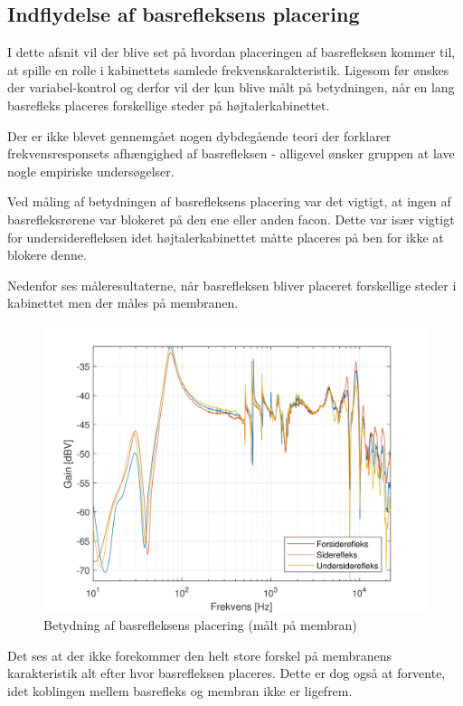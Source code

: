 \subsection{Indflydelse af basrefleksens placering}
I dette afsnit vil der blive set på hvordan placeringen af basrefleksen kommer til, at spille en rolle i kabinettets samlede frekvenskarakteristik. Ligesom før ønskes der variabel-kontrol og derfor vil der kun blive målt på betydningen, når en lang basrefleks placeres forskellige steder på højtalerkabinettet.

Der er ikke blevet gennemgået nogen dybdegående teori der forklarer frekvensresponsets afhængighed af basrefleksen - alligevel ønsker gruppen at lave nogle empiriske undersøgelser.

Ved måling af betydningen af basrefleksens placering var det vigtigt, at ingen af basrefleksrørene var blokeret på den ene eller anden facon. Dette var især vigtigt for undersiderefleksen idet højtalerkabinettet måtte placeres på ben for ikke at blokere denne.

Nedenfor ses måleresultaterne, når basrefleksen bliver placeret forskellige steder i kabinettet men der måles på membranen.
\begin{figure}[H]
	\centering
	\vspace{-12pt}
	\includegraphics[width=\textwidth]{Billeder/Grafer/BasrefleksPlacementClose}
	\caption{Betydning af basrefleksens placering (målt på membran)}
\end{figure}

Det ses at der ikke forekommer den helt store forskel på membranens karakteristik alt efter hvor basrefleksen placeres. Dette er dog også at forvente, idet koblingen mellem basrefleks og membran ikke er ligefrem.

